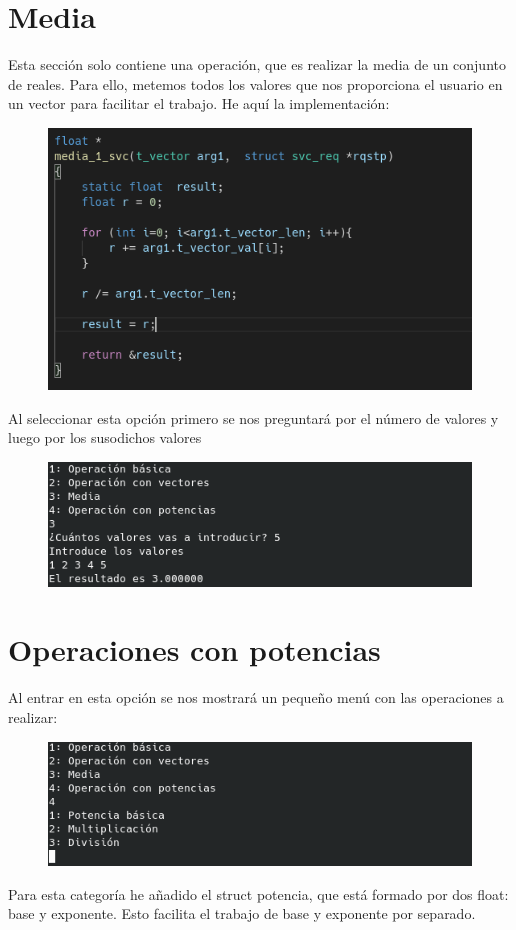 \documentclass{article}
\begin{document}
	\section{Media}
	Esta sección solo contiene una operación, que es realizar la media de un conjunto de reales. Para ello, metemos todos los valores que nos proporciona el usuario en un vector para facilitar el trabajo. He aquí la implementación:
	\begin{figure}[H]
		\centering
		\includegraphics[totalheight=7.7cm]{img/19.png}
	\end{figure}
	Al seleccionar esta opción primero se nos preguntará por el número de valores y luego por los susodichos valores
	\begin{figure}[H]
		\centering
		\includegraphics[totalheight=3.7cm]{img/20.png}
	\end{figure}
	\section{Operaciones con potencias}
	Al entrar en esta opción se nos mostrará un pequeño menú con las operaciones a realizar:
	\begin{figure}[H]
		\centering
		\includegraphics[totalheight=3.7cm]{img/21.png}
	\end{figure}
	Para esta categoría he añadido el struct potencia, que está formado por dos float: base y exponente. Esto facilita el trabajo de base y exponente por separado.
\end{document}
